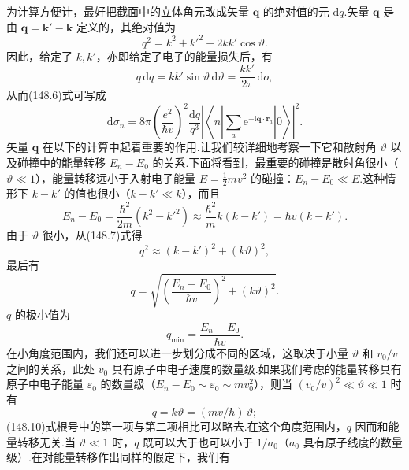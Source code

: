 为计算方便计，最好把截面中的立体角元改成矢量 $\boldsymbol{q}$ 的绝对值的元 $\mathrm{d}q$.矢量 $\boldsymbol{q}$ 是由 $\boldsymbol{q}=\boldsymbol{k}'-\boldsymbol{k}$ 定义的，其绝对值为
\begin{equation}
  q^2=k^2+k'^2-2kk'\cos\vartheta.
\end{equation}
因此，给定了 $k,k'$，亦即给定了电子的能量损失后，有
\begin{equation}
  q\,\mathrm{d}q=kk'\sin\vartheta\,\mathrm{d}\vartheta=\frac{kk'}{2\pi}\,\mathrm{d}o,
\end{equation}
从而(148.6)式可写成
\begin{equation}
  \mathrm{d}\sigma_n=8\pi\left(\frac{e^2}{\hbar v}\right)^2\frac{\mathrm{d}q}{q^3}
  \left|\left\langle n\left|\sum_a\mathrm{e}^{-\mathrm{i}\boldsymbol{q}\cdot\boldsymbol{r}_a}\right|0\right\rangle\right|^2.
\end{equation}
矢量 $\boldsymbol{q}$ 在以下的计算中起着重要的作用.让我们较详细地考察一下它和散射角 $\vartheta$ 以及碰撞中的能量转移 $E_n-E_0$ 的关系.下面将看到，最重要的碰撞是散射角很小（$\vartheta\ll1$），能量转移远小于入射电子能量 $E=\frac{1}{2}mv^2$ 的碰撞：$E_n-E_0\ll E$.这种情形下 $k-k'$ 的值也很小（$k-k'\ll k$），而且
\begin{equation*}
  E_n-E_0=\frac{\hbar^2}{2m}\left(k^2-k'^2\right)
  \approx\frac{\hbar^2}{m}k(k-k')=\hbar v(k-k').
\end{equation*}
由于 $\vartheta$ 很小，从(148.7)式得
\begin{equation*}
  q^2\approx(k-k')^2+(k\vartheta)^2,
\end{equation*}
最后有
\begin{equation}
  q=\sqrt{\left(\frac{E_n-E_0}{\hbar v}\right)^2+(k\vartheta)^2}.
\end{equation}
$q$ 的极小值为
\begin{equation}
  q_{\mathrm{min}}=\frac{E_n-E_0}{\hbar v}.
\end{equation}
在小角度范围内，我们还可以进一步划分成不同的区域，这取决于小量 $\vartheta$ 和 $v_0/v$ 之间的关系，此处 $v_0$ 具有原子中电子速度的数量级.如果我们考虑的能量转移具有原子中电子能量 $\varepsilon_0$ 的数量级（$E_n-E_0\sim\varepsilon_0\sim mv_0^2$），则当 $(v_0/v)^2\ll\vartheta\ll1$ 时有
\begin{equation}
  q=k\vartheta=(mv/\hbar)\,\vartheta;
\end{equation}
(148.10)式根号中的第一项与第二项相比可以略去.在这个角度范围内，$q$ 因而和能量转移无关.当 $\vartheta\ll1$ 时，$q$ 既可以大于也可以小于 $1/a_0$（$a_0$ 具有原子线度的数量级）.在对能量转移作出同样的假定下，我们有

